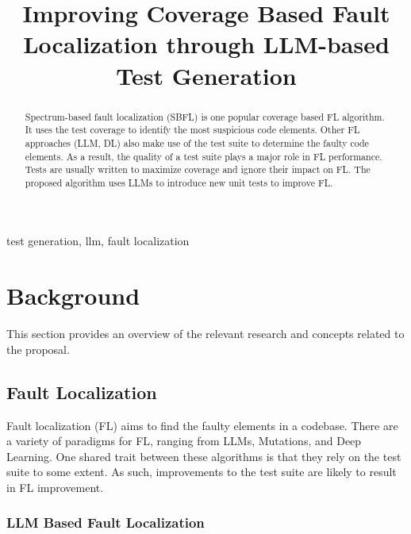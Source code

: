 \documentclass[conference]{IEEEtran}
\begin{document}
\title{Improving Coverage Based Fault Localization through LLM-based Test Generation}

\author{
}

\maketitle

\begin{abstract}
Spectrum-based fault localization (SBFL) is one popular coverage based FL algorithm. It uses the test coverage to identify the most suspicious code elements. Other FL approaches (LLM, DL) also make use of the test suite to determine the faulty code elements. As a result, the quality of a test suite plays a major role in FL performance. Tests are usually written to maximize coverage and ignore their impact on FL. The proposed algorithm uses LLMs to introduce new unit tests to improve FL.
\end{abstract}

\begin{IEEEkeywords}
test generation, llm, fault localization
\end{IEEEkeywords}

\section{Background}

This section provides an overview of the relevant research and concepts related to the proposal.

\subsection{Fault Localization}

Fault localization (FL) aims to find the faulty elements in a codebase. There are a variety of paradigms for FL, ranging from LLMs, Mutations, and Deep Learning. One shared trait between these algorithms is that they rely on the test suite to some extent. As such, improvements to the test suite are likely to result in FL improvement.

\subsubsection{LLM Based Fault Localization}
\end{document}
